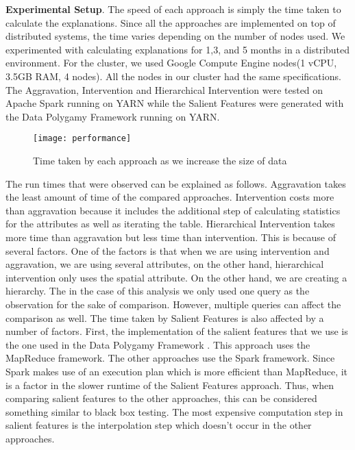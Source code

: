 \textbf{Experimental Setup}. The speed of each approach is simply the time taken to calculate the explanations. Since all the approaches are implemented on top of distributed systems, the time varies depending on the number of nodes used. We experimented with calculating explanations for 1,3, and 5 months in a distributed environment. For the cluster, we used Google Compute Engine nodes(1 vCPU, 3.5GB RAM, 4 nodes). All the nodes in our cluster had the same specifications. The Aggravation, Intervention and Hierarchical Intervention were tested on Apache Spark running on YARN while the Salient Features were generated with the Data Polygamy Framework running on YARN.
\begin{figure}[h]
\texttt{[image: performance]}
\caption{Time taken by each approach as we increase the size of data}
\label{fig:performance}
\end{figure}
\newline
The run times that were observed can be explained as follows. Aggravation takes the least amount of time of the compared approaches. Intervention costs more than aggravation because it includes the additional step of calculating statistics for the attributes as well as iterating the table. Hierarchical Intervention takes more time than aggravation but less time than intervention. This is because of several factors. One of the factors is that when we are using intervention and aggravation, we are using several attributes, on the other hand, hierarchical intervention only uses the spatial attribute. On the other hand, we are creating a hierarchy. The in the case of this analysis we only used one query as the observation for the sake of comparison. However, multiple queries can affect the comparison as well. The time taken by Salient Features is also affected by a number of factors. First, the implementation of the salient features that we use is the one used in the Data Polygamy Framework \citep{chirigati2016data}. This approach uses the MapReduce framework. The other approaches use the Spark framework. Since Spark makes use of an execution plan which is more efficient than MapReduce, it is a factor in the slower runtime of the Salient Features approach. Thus, when comparing salient features to the other approaches, this can be considered something similar to black box testing. The most expensive computation step in salient features is the interpolation step which doesn't occur in the other approaches.


